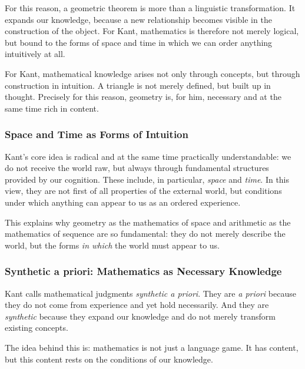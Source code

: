 For this reason, a geometric theorem is more
than a linguistic transformation.
It expands our knowledge,
because a new relationship becomes visible
in the construction of the object.
For Kant, mathematics is therefore not merely logical,
but bound to the forms of space and time
in which we can order anything intuitively at all.

\begin{DidacticBox}
	\label{box:kant-triangle}
	\small
	For Kant, mathematical knowledge arises not only through concepts,
	but through construction in intuition.
	A triangle is not merely defined,
	but built up in thought.
	Precisely for this reason, geometry is, for him,
	necessary and at the same time rich in content.
\end{DidacticBox}

\subsubsection*{Space and Time as Forms of Intuition}

Kant's core idea is radical
and at the same time practically understandable:
we do not receive the world raw,
but always through fundamental structures
provided by our cognition.
These include, in particular, \emph{space} and \emph{time}.
In this view, they are not first of all properties of the external world,
but conditions
under which anything can appear to us as an ordered experience.

This explains
why geometry as the mathematics of space
and arithmetic as the mathematics of sequence
are so fundamental:
they do not merely describe the world,
but the forms
\emph{in which} the world must appear to us.

\subsubsection*{\texorpdfstring{Synthetic a priori}{Synthetic a priori}: Mathematics as Necessary Knowledge}

Kant calls mathematical judgments \emph{synthetic a priori}.
They are \emph{a priori}
because they do not come from experience
and yet hold necessarily.
And they are \emph{synthetic}
because they expand our knowledge
and do not merely transform existing concepts.

The idea behind this is:
mathematics is not just a language game.
It has content,
but this content rests on the conditions of our knowledge.

